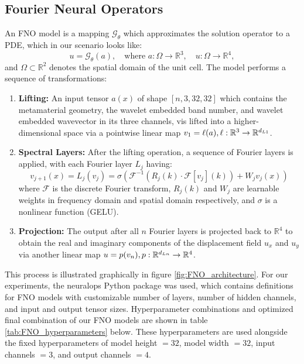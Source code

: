 \documentclass[preprint,review,12pt]{elsarticle}
\begin{document}
\subsection{Fourier Neural Operators}
\label{ssec:fourer_neural_operators}
An FNO model is a mapping $\mathcal{G}_\theta$ which approximates the solution operator to a PDE, which in our scenario looks like:
\begin{equation}
    u = \mathcal{G}_\theta(a), \quad \text{where } a: \Omega \to \mathbb{R}^3, \quad u: \Omega \to \mathbb{R}^4,
\end{equation}
and $\Omega \subset \mathbb{R}^2$ denotes the spatial domain of the unit cell. The model performs a sequence of transformations:
\begin{enumerate}
    \item \textbf{Lifting:} An input tensor $a(x)$ of shape $[n, 3, 32, 32]$ which contains the metamaterial geometry, the wavelet embedded band number, and wavelet embedded wavevector in its three channels, vis lifted into a higher-dimensional space via a pointwise linear map $v_1 = \ell(a), \space \ell : \mathbb{R}^{3} \to \mathbb{R}^{d_{L1}}$.
    \item \textbf{Spectral Layers:} After the lifting operation, a sequence of Fourier layers is applied, with each Fourier layer $L_j$ having:
    \begin{equation}
        v_{j+1}(x) = L_j(v_j) = \sigma\left( \mathcal{F}^{-1}\left( R_j(k) \cdot \mathcal{F}[v_j](k) \right) + W_j v_j(x) \right)
    \end{equation}
    where $\mathcal{F}$ is the discrete Fourier transform, $R_j(k)$ and $W_j$ are learnable weights in frequency domain and spatial domain respectively, and $\sigma$ is a nonlinear function (GELU).
    \item \textbf{Projection:} The output after all $n$ Fourier layers is projected back to $\mathbb{R}^4$ to obtain the real and imaginary components of the displacement field $u_x$ and $u_y$ via another linear map $u = p(v_n), \space p : \mathbb{R}^{d_{Ln}} \to \mathbb{R}^{4}$.
\end{enumerate}

This process is illustrated graphically in figure \ref{fig:FNO_architecture}. For our experiments, the neuralops Python package was used, which contains definitions for FNO models with customizable number of layers, number of hidden channels, and input and output tensor sizes. Hyperparameter combinations and optimized final combination of our FNO models are shown in table \ref{tab:FNO_hyperparameters} below. These hyperparameters are used alongside the fixed hyperparameters of model height $=32$, model width $=32$, input channels $=3$, and output channels $=4$.
\end{document}
